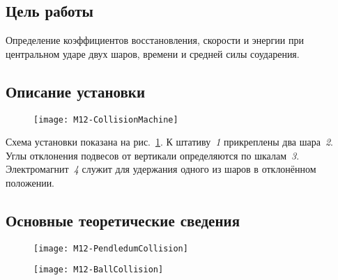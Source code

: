 \documentclass[a4paper, 12pt]{extarticle}
\begin{document}
\MTDTitlePage
\MTDInfoPage

\setcounter{section}{12}

\subsection{Цель работы}
Определение коэффициентов восстановления, скорости и энергии при центральном ударе двух шаров, времени и средней силы соударения.\
\subsection{Описание установки}

\begin{figure}[H]
\centering
\texttt{[image: M12-CollisionMachine]}
\caption{\label{fig:m12-equipment}}
\end{figure}

Схема установки показана на рис.~\ref{fig:m12-equipment}. К штативу~\emph{1} прикреплены два шара~\emph{2}. Углы отклонения подвесов от вертикали определяются по шкалам~\emph{3}. Электромагнит~\emph{4} служит для удержания одного из шаров в отклонённом положении.

\subsection{Основные теоретические сведения}

\begin{figure}[H]
\centering
\begin{minipage}[b]{0.45\linewidth}
\centering
\texttt{[image: M12-PendledumCollision]}
\caption{\label{fig:m12-1}} %
\end{minipage} \hspace{-1.5cm} %
\begin{minipage}[b]{0.45\linewidth}
\centering
\texttt{[image: M12-BallCollision]}
\caption{\label{fig:m12-2}} %
\end{minipage}
\end{figure}
\end{document}
